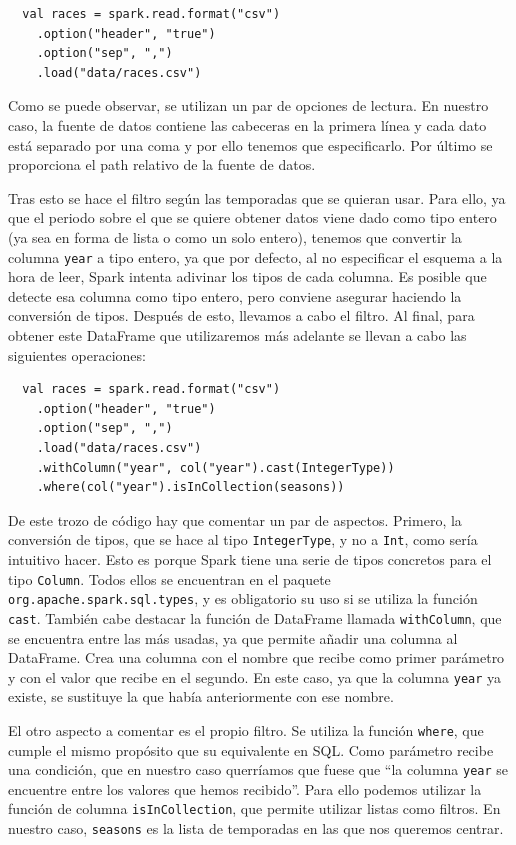 \documentclass[12pt,twoside,titlepage]{report}
\newcommand{\quotes}[1]{``#1''}
\begin{document}
\begin{lstlisting}
  val races = spark.read.format("csv")
    .option("header", "true")
    .option("sep", ",")
    .load("data/races.csv")
\end{lstlisting}

Como se puede observar, se utilizan un par de opciones de lectura. En nuestro caso, la fuente de datos contiene las cabeceras en la primera línea y cada dato está separado por una coma y por ello tenemos que especificarlo. Por último se proporciona el path relativo de la fuente de datos.

Tras esto se hace el filtro según las temporadas que se quieran usar. Para ello, ya que el periodo sobre el que se quiere obtener datos viene dado como tipo entero (ya sea en forma de lista o como un solo entero), tenemos que convertir la columna \texttt{year} a tipo entero, ya que por defecto, al no especificar el esquema a la hora de leer, Spark intenta adivinar los tipos de cada columna. Es posible que detecte esa columna como tipo entero, pero conviene asegurar haciendo la conversión de tipos. Después de esto, llevamos a cabo el filtro. Al final, para obtener este DataFrame que utilizaremos más adelante se llevan a cabo las siguientes operaciones:

\begin{lstlisting}
  val races = spark.read.format("csv")
    .option("header", "true")
    .option("sep", ",")
    .load("data/races.csv")
    .withColumn("year", col("year").cast(IntegerType))
    .where(col("year").isInCollection(seasons))
\end{lstlisting}

De este trozo de código hay que comentar un par de aspectos. Primero, la conversión de tipos, que se hace al tipo \texttt{IntegerType}, y no a \texttt{Int}, como sería intuitivo hacer. Esto es porque Spark tiene una serie de tipos concretos para el tipo \texttt{Column}. Todos ellos se encuentran en el paquete \texttt{org.apache.spark.sql.types}, y es obligatorio su uso si se utiliza la función \texttt{cast}. También cabe destacar la función de DataFrame llamada \texttt{withColumn}, que se encuentra entre las más usadas, ya que permite añadir una columna al DataFrame. Crea una columna con el nombre que recibe como primer parámetro y con el valor que recibe en el segundo. En este caso, ya que la columna \texttt{year} ya existe, se sustituye la que había anteriormente con ese nombre.

El otro aspecto a comentar es el propio filtro. Se utiliza la función \texttt{where}, que cumple el mismo propósito que su equivalente en SQL. Como parámetro recibe una condición, que en nuestro caso querríamos que fuese que \quotes{la columna \texttt{year} se encuentre entre los valores que hemos recibido}. Para ello podemos utilizar la función de columna \texttt{isInCollection}, que permite utilizar listas como filtros. En nuestro caso, \texttt{seasons} es la lista de temporadas en las que nos queremos centrar.
\end{document}
